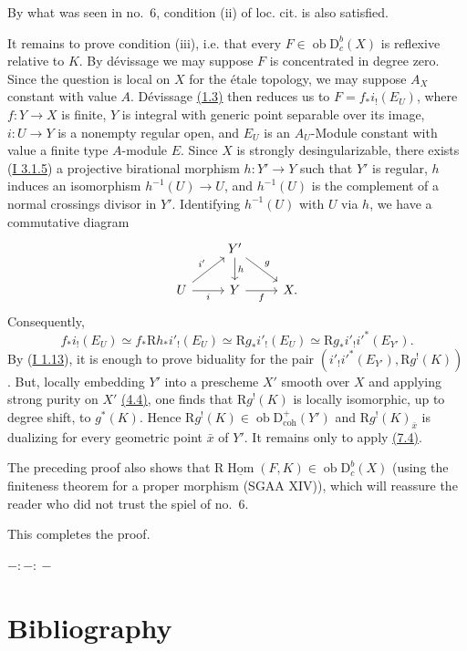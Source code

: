 \documentclass[11pt]{article}
\DeclareMathOperator{\Hom}{Hom}
\newcommand{\R}{\mathrm{R}}
\newcommand{\D}{\mathrm{D}}
\newcommand{\ob}{\operatorname{ob}}
\providecommand{\Hom}{\operatorname{Hom}}
\providecommand{\ob}{\operatorname{ob}}
\providecommand{\R}{\mathrm R}
\providecommand{\Hom}{\operatorname{Hom}}
\begin{document}
By what was seen in no.~6, condition (ii) of loc. cit. is also satisfied.

It remains to prove condition (iii), i.e. that every $F\in\ob\D_c^b(X)$ is reflexive relative to $K$. By dévissage we may suppose $F$ is concentrated in degree zero. Since the question is local on $X$ for the étale topology, we may suppose $A_X$ constant with value $A$. Dévissage \hyperref[sga5:I:proposition:1.3:2]{(1.3)} then reduces us to $F=f_*i_!(E_U)$, where $f:Y\to X$ is finite, $Y$ is integral with generic point separable over its image, $i:U\to Y$ is a nonempty regular open, and $E_U$ is an $A_U$-Module constant with value a finite type $A$-module $E$. Since $X$ is strongly desingularizable, there exists (\hyperref[sga5:I:statement:3.1.5]{I 3.1.5}) a projective birational morphism $h:Y'\to Y$ such that $Y'$ is regular, $h$ induces an isomorphism $h^{-1}(U)\to U$, and $h^{-1}(U)$ is the complement of a normal crossings divisor in $Y'$. Identifying $h^{-1}(U)$ with $U$ via $h$, we have a commutative diagram
\[
\begin{tikzcd}
& Y' \arrow[d,"h"] \arrow[dr,"g"] & \\
U \arrow[ur,"i'"] \arrow[r,"i"'] & Y \arrow[r,"f"'] & X.
\end{tikzcd}
\]
Consequently,
\[
        f_*i_!(E_U)\simeq f_*\R h_* i'_!(E_U)\simeq \R g_* i'_!(E_U)\simeq \R g_* i'_! i'^*(E_{Y'}).
\]
By (\hyperref[sga5:I:corollary:1.13]{I 1.13}), it is enough to prove biduality for the pair $(i'_!i'^*(E_{Y'}),\R g^!(K))$. But, locally embedding $Y'$ into a prescheme $X'$ smooth over $X$ and applying strong purity on $X'$ \hyperref[sga5:I:definition:4.4]{(4.4)}, one finds that $\R g^!(K)$ is locally isomorphic, up to degree shift, to $g^*(K)$. Hence $\R g^!(K)\in\ob\D^{+}_{\mathrm{coh}}(Y')$ and $\R g^!(K)_{\bar{x}}$ is dualizing for every geometric point $\bar{x}$ of $Y'$. It remains only to apply \hyperref[sga5:I:lemma:7.4]{(7.4)}.

The preceding proof also shows that $\R\underline{\Hom}(F,K)\in\ob\D_c^b(X)$ (using the finiteness theorem for a proper morphism (SGAA XIV)), which will reassure the reader who did not trust the spiel of no.~6.

This completes the proof.

\begin{center}
$-:\!-:\!-$
\end{center}

\section*{Bibliography}
\end{document}

